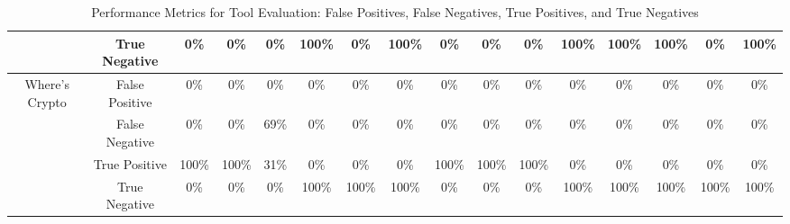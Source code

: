 \begin{table}[htb]
\begin{adjustbox}{width=\textwidth}
\begin{tabular}{cc|ccccccccc|ccccc}
\multicolumn{1}{c|}{} & \multicolumn{1}{c||}{True Negative} & \multicolumn{1}{c|}{0\%} & \multicolumn{1}{c|}{0\%} & \multicolumn{1}{c|}{0\%} & \multicolumn{1}{c|}{100\%} & \multicolumn{1}{c|}{0\%} & \multicolumn{1}{c|}{100\%} & \multicolumn{1}{c|}{0\%} & \multicolumn{1}{c|}{0\%} & \multicolumn{1}{c|}{0\%} & \multicolumn{1}{c|}{100\%} & \multicolumn{1}{c|}{100\%} & \multicolumn{1}{c|}{100\%} & \multicolumn{1}{c|}{0\%} & 100\% \\ \hline
\multicolumn{1}{c|}{\multirow{4}{*}{Where's Crypto}} & \multicolumn{1}{c||}{False Positive} & \multicolumn{1}{c|}{0\%} & \multicolumn{1}{c|}{0\%} & \multicolumn{1}{c|}{0\%} & \multicolumn{1}{c|}{0\%} & \multicolumn{1}{c|}{0\%} & \multicolumn{1}{c|}{0\%} & \multicolumn{1}{c|}{0\%} & \multicolumn{1}{c|}{0\%} & \multicolumn{1}{c|}{0\%} & \multicolumn{1}{c|}{0\%} & \multicolumn{1}{c|}{0\%} & \multicolumn{1}{c|}{0\%} & \multicolumn{1}{c|}{0\%} & 0\% \\ \cline{2-16} 
\multicolumn{1}{c|}{} & \multicolumn{1}{c||}{False Negative} & \multicolumn{1}{c|}{0\%} & \multicolumn{1}{c|}{0\%} & \multicolumn{1}{c|}{69\%} & \multicolumn{1}{c|}{0\%} & \multicolumn{1}{c|}{0\%} & \multicolumn{1}{c|}{0\%} & \multicolumn{1}{c|}{0\%} & \multicolumn{1}{c|}{0\%} & \multicolumn{1}{c|}{0\%} & \multicolumn{1}{c|}{0\%} & \multicolumn{1}{c|}{0\%} & \multicolumn{1}{c|}{0\%} & \multicolumn{1}{c|}{0\%} & 0\% \\ \cline{2-16} 
\multicolumn{1}{c|}{} & \multicolumn{1}{c||}{True Positive} & \multicolumn{1}{c|}{100\%} & \multicolumn{1}{c|}{100\%} & \multicolumn{1}{c|}{31\%} & \multicolumn{1}{c|}{0\%} & \multicolumn{1}{c|}{0\%} & \multicolumn{1}{c|}{0\%} & \multicolumn{1}{c|}{100\%} & \multicolumn{1}{c|}{100\%} & \multicolumn{1}{c|}{100\%} & \multicolumn{1}{c|}{0\%} & \multicolumn{1}{c|}{0\%} & \multicolumn{1}{c|}{0\%} & \multicolumn{1}{c|}{0\%} & 0\% \\ \cline{2-16} 
\multicolumn{1}{c|}{} & \multicolumn{1}{c||}{True Negative} & \multicolumn{1}{c|}{0\%} & \multicolumn{1}{c|}{0\%} & \multicolumn{1}{c|}{0\%} & \multicolumn{1}{c|}{100\%} & \multicolumn{1}{c|}{100\%} & \multicolumn{1}{c|}{100\%} & \multicolumn{1}{c|}{0\%} & \multicolumn{1}{c|}{0\%} & \multicolumn{1}{c|}{0\%} & \multicolumn{1}{c|}{100\%} & \multicolumn{1}{c|}{100\%} & \multicolumn{1}{c|}{100\%} & \multicolumn{1}{c|}{100\%} & 100\% \\ \hline
\end{tabular}
\end{adjustbox}
\caption{Performance Metrics for Tool Evaluation: False Positives, False Negatives, True Positives, and True Negatives}
\label{tab:cryptobinary-quat}
\end{table}
